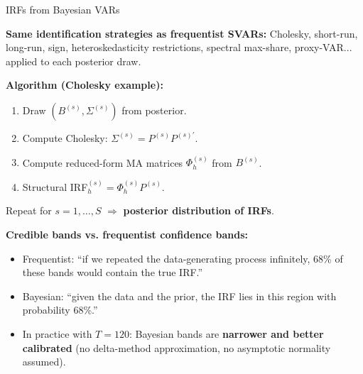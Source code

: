 \documentclass{beamer}
\begin{document}
\begin{frame}{IRFs from Bayesian VARs}
\footnotesize

\textbf{Same identification strategies as frequentist SVARs:}
Cholesky, short-run, long-run, sign, heteroskedasticity restrictions, spectral max-share, proxy-VAR... applied to each posterior draw.

\medskip
\textbf{Algorithm (Cholesky example):}
\begin{enumerate}
  \item Draw $(B^{(s)}, \Sigma^{(s)})$ from posterior.
  \item Compute Cholesky: $\Sigma^{(s)} = P^{(s)} P^{(s)\prime}$.
  \item Compute reduced-form MA matrices $\Phi_h^{(s)}$ from $B^{(s)}$.
  \item Structural IRF$_h^{(s)} = \Phi_h^{(s)} P^{(s)}$.
\end{enumerate}
Repeat for $s = 1, \dots, S$ $\Rightarrow$ \textbf{posterior distribution of IRFs}.

\medskip
\textbf{Credible bands vs. frequentist confidence bands:}
\begin{itemize}
  \item Frequentist: ``if we repeated the data-generating process infinitely, 68\% of these bands would contain the true IRF.''
  \item Bayesian: ``given the data and the prior, the IRF lies in this region with probability 68\%.''
  \item In practice with $T=120$: Bayesian bands are \textbf{narrower and better calibrated}
        (no delta-method approximation, no asymptotic normality assumed).
\end{itemize}

\end{frame}
\end{document}
